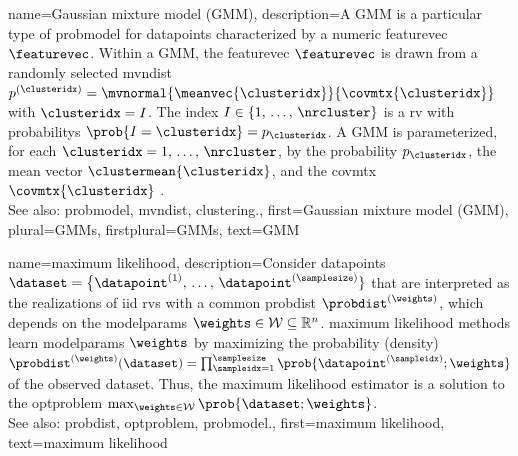 {name={Gaussian mixture model (GMM)}, 
	description={A GMM is a particular type of \gls{probmodel} 
	    for \glspl{datapoint} characterized by a numeric \gls{featurevec} $\featurevec$. 
		Within a GMM, the \gls{featurevec} $\featurevec$ is drawn from a randomly selected 
		\gls{mvndist} $p^{(\clusteridx)} = \mvnormal{\meanvec{\clusteridx}}{\covmtx{\clusteridx}}$ with 
		$\clusteridx = I$. The index $I \in \{1, \,\ldots, \,\nrcluster\}$ is a \gls{rv} with 
		\glspl{probability} $\prob{I=\clusteridx} = p_{\clusteridx}$. A GMM is 
		parameterized, for each $\clusteridx=1, \,\ldots, \,\nrcluster$, 
		by the \gls{probability} $p_{\clusteridx}$, the \gls{mean} \gls{vector} 
		$\clustermean{\clusteridx}$, and the \gls{covmtx} $\covmtx{\clusteridx}$ . 
				\\
		See also: \gls{probmodel}, \gls{mvndist}, \gls{clustering}.},
	first={Gaussian mixture model (GMM)},
	plural={GMMs}, 
	firstplural={GMMs}, 
	text={GMM} 
}
 
{name={maximum likelihood}, 
	description={Consider \glspl{datapoint} 
	$\dataset=\big\{ \datapoint^{(1)}, \,\ldots, \,\datapoint^{(\samplesize)} \}$ 
	that are interpreted as the \glspl{realization} of \gls{iid} \glspl{rv} 
	with a common \gls{probdist} $\probdist^{(\weights)}$, which depends 
	on the \glspl{modelparam} $\weights \in \mathcal{W} \subseteq \mathbb{R}^{n}$. 
		\Gls{maximum} likelihood methods learn \glspl{modelparam} $\weights$ by maximizing 
		the probability (density) $\probdist^{(\weights)}(\dataset) = \prod_{\sampleidx=1}^{\samplesize} \prob{\datapoint^{(\sampleidx)}; \weights}$ 
		of the observed \gls{dataset}. Thus, the \gls{maximum} likelihood estimator is a 
		solution to the \gls{optproblem} $\max_{\weights \in \mathcal{W}} \prob{\dataset; \weights}$.
				\\
		See also: \gls{probdist}, \gls{optproblem}, \gls{probmodel}.},
	first={maximum likelihood},
	text={maximum likelihood}
}


